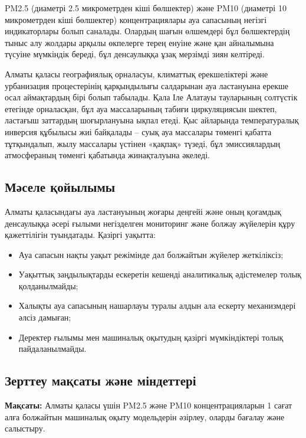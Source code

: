 \documentclass[12pt,a4paper]{article}
\begin{document}
PM2.5 (диаметрі 2.5 микрометрден кіші бөлшектер) және PM10 (диаметрі 10 микрометрден кіші бөлшектер) концентрациялары ауа сапасының негізгі индикаторлары болып саналады. Олардың шағын өлшемдері бұл бөлшектердің тыныс алу жолдары арқылы өкпелерге терең енуіне және қан айналымына түсуіне мүмкіндік береді, бұл денсаулыққа ұзақ мерзімді зиян келтіреді.

Алматы қаласы географиялық орналасуы, климаттық ерекшеліктері және урбанизация процестерінің қарқындылығы салдарынан ауа ластануына ерекше осал аймақтардың бірі болып табылады. Қала Іле Алатауы тауларының солтүстік етегінде орналасқан, бұл ауа массаларының табиғи циркуляциясын шектеп, ластағыш заттардың шоғырлануына ықпал етеді. Қыс айларында температуралық инверсия құбылысы жиі байқалады – суық ауа массалары төменгі қабатта тұтқындалып, жылу массалары үстінен «қақпақ» түзеді, бұл эмиссиялардың атмосфераның төменгі қабатында жинақталуына әкеледі.

\subsection{Мәселе қойылымы}

Алматы қаласындағы ауа ластануының жоғары деңгейі және оның қоғамдық денсаулыққа әсері ғылыми негізделген мониторинг және болжау жүйелерін құру қажеттілігін туындатады. Қазіргі уақытта:
\begin{itemize}
\item Ауа сапасын нақты уақыт режімінде дәл болжайтын жүйелер жеткіліксіз;
\item Уақыттық заңдылықтарды ескеретін кешенді аналитикалық әдістемелер толық қолданылмайды;
\item Халықты ауа сапасының нашарлауы туралы алдын ала ескерту механизмдері әлсіз дамыған;
\item Деректер ғылымы мен машиналық оқытудың қазіргі мүмкіндіктері толық пайдаланылмайды.
\end{itemize}

\subsection{Зерттеу мақсаты және міндеттері}

\textbf{Мақсаты:} Алматы қаласы үшін PM2.5 және PM10 концентрацияларын 1 сағат алға болжайтын машиналық оқыту модельдерін әзірлеу, оларды бағалау және салыстыру.
\end{document}
